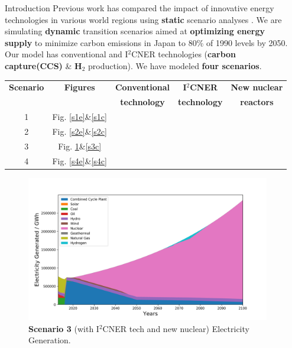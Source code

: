 \documentclass[final]{beamer}
\newlength{\onecolwid}
\newcommand{\greencheck}{{\color{green}\checkmark}}
\newcommand{\xmark}{{\color{red}\ding{55}}}
\begin{document}
\begin{frame}[t]
\begin{columns}
\begin{column}{\onecolwid}
\end{column} %
\begin{column}{\onecolwid} %
\begin{block}{Introduction}
Previous work has compared the impact of innovative energy technologies in 
various world regions using \textbf{static} scenario analyses 
\cite{kikuchi_simulation-based_2017,pambudi_impact_2017}.  
We are simulating \textbf{dynamic} transition scenarios 
\cite{pfenninger_energy_2014} aimed at \textbf{optimizing energy supply} to minimize carbon 
emissions in Japan to 80\% of 1990 levels by 2050.
Our model has conventional and I$^2$CNER technologies (\textbf{carbon capture(CCS)} \& \textbf{H$_2$} production). We have modeled \textbf{four scenarios}.
\end{block}
\begin{tabular}{| c | c | c | c | c |}
\hline
\textbf{Scenario}& \textbf{Figures}&\textbf{Conventional}&\textbf{I$^2$CNER}&\textbf{New nuclear}\\
                 &             &\textbf{technology}&\textbf{technology}&\textbf{reactors}\\
                  \hline
1               & Fig. \ref{s1e}\&\ref{s1c}&      \greencheck           &         \xmark       &      \greencheck     \\ 
2               & Fig. \ref{s2e}\&\ref{s2c}&      \greencheck           &         \xmark       &         \xmark       \\ 
3               & Fig. \ref{s3e}\&\ref{s3c}&      \greencheck           &      \greencheck     &      \greencheck     \\ 
4               & Fig. \ref{s4e}\&\ref{s4c}&      \greencheck           &      \greencheck     &         \xmark       \\
\hline
\end{tabular}

\begin{figure}[H] 
\centering
\includegraphics[scale=1.1]{./plots/i2cnerNuc_ele.png}
\caption{\textbf{Scenario 3} (with I$^2$CNER tech and new nuclear) Electricity Generation.}
\label{s3e}
\end{figure}


\end{column}
\end{columns}
\end{frame}
\end{document}
